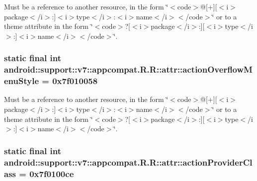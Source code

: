 Must be a reference to another resource, in the form \char`\"{}$<$code$>$@\mbox{[}+\mbox{]}\mbox{[}$<$i$>$package$<$/i$>$:\mbox{]}$<$i$>$type$<$/i$>$:$<$i$>$name$<$/i$>$$<$/code$>$\char`\"{} or to a theme attribute in the form \char`\"{}$<$code$>$?\mbox{[}$<$i$>$package$<$/i$>$:\mbox{]}\mbox{[}$<$i$>$type$<$/i$>$:\mbox{]}$<$i$>$name$<$/i$>$$<$/code$>$\char`\"{}. \hypertarget{classandroid_1_1support_1_1v7_1_1appcompat_1_1_r_1_1attr_ffaaa93b355801f138a37e4df055b207}{
\subsubsection[{actionOverflowMenuStyle}]{\setlength{\rightskip}{0pt plus 5cm}static final int android::support::v7::appcompat.R.R::attr::actionOverflowMenuStyle = 0x7f010058}}
\label{classandroid_1_1support_1_1v7_1_1appcompat_1_1_r_1_1attr_ffaaa93b355801f138a37e4df055b207}


Must be a reference to another resource, in the form \char`\"{}$<$code$>$@\mbox{[}+\mbox{]}\mbox{[}$<$i$>$package$<$/i$>$:\mbox{]}$<$i$>$type$<$/i$>$:$<$i$>$name$<$/i$>$$<$/code$>$\char`\"{} or to a theme attribute in the form \char`\"{}$<$code$>$?\mbox{[}$<$i$>$package$<$/i$>$:\mbox{]}\mbox{[}$<$i$>$type$<$/i$>$:\mbox{]}$<$i$>$name$<$/i$>$$<$/code$>$\char`\"{}. \hypertarget{classandroid_1_1support_1_1v7_1_1appcompat_1_1_r_1_1attr_839944fe51f8445502215fd72d47af5c}{
\subsubsection[{actionProviderClass}]{\setlength{\rightskip}{0pt plus 5cm}static final int android::support::v7::appcompat.R.R::attr::actionProviderClass = 0x7f0100ce}}
\label{classandroid_1_1support_1_1v7_1_1appcompat_1_1_r_1_1attr_839944fe51f8445502215fd72d47af5c}


